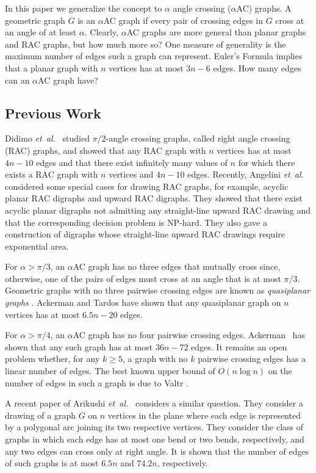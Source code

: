 \documentclass{patmorin}
\newcommand{\etal}{\emph{et~al.}}
\begin{document}
In this paper we generalize the concept to $\alpha$ angle crossing ($\alpha$AC) graphs.  A geometric graph $G$ is an $\alpha$AC graph if every pair of crossing edges in $G$ cross at an angle of at least $\alpha$.  Clearly, $\alpha$AC graphs are more general than planar graphs and RAC graphs, but how much more so?  One measure of generality is the maximum number of edges such a graph can represent.  Euler's Formula implies that a planar graph with $n$ vertices has at most $3n-6$ edges.  How many edges can an $\alpha$AC graph have?


\subsection{Previous Work}
Didimo \etal\ \cite{del-dgrac-09} studied $\pi/2$-angle crossing graphs, called right angle
crossing (RAC) graphs, and showed that any RAC graph with $n$ vertices has at most $4n-10$ edges and
that there exist infinitely many values of $n$ for
which there exists a RAC graph with $n$ vertices and $4n-10$ edges.
Recently, Angelini \etal~\cite{acddfks-porac-09} considered some
special cases for drawing RAC graphs, for example, acyclic planar RAC
digraphs and upward RAC digraphs. They showed that there exist acyclic planar
digraphs not admitting any straight-line upward RAC drawing and that the
corresponding decision problem is NP-hard. They also gave a construction of
digraphs whose straight-line upward RAC drawings require exponential area.

For $\alpha > \pi/3$, an $\alpha$AC graph has no three edges that
mutually cross since, otherwise, one of the pairs of edges must
cross at an angle that is at most $\pi/3$.  Geometric graphs with no
three pairwise crossing edges are known as \emph{quasiplanar graphs}
\cite{aapps-qpgln-97}. Ackerman and Tardos \cite[Theorem~5]{at-mneqp-07} have shown that
any quasiplanar graph on $n$ vertices has at most $6.5n - 20$ edges.

For $\alpha > \pi/4$, an $\alpha$AC graph has no four pairwise crossing edges.
Ackerman~\cite{a-mnetg-09} has shown that any such graph has at most $36n - 72$ 
edges.  It remains an open problem whether, for any $k\ge 5$, a graph with no
$k$ pairwise crossing edges has a linear number of edges.  The best known
upper bound of $O(n\log n)$ on the number of edges in such a graph is due
to Valtr \cite[Theorem~3]{v-epct-99}.

A recent paper of Arikushi \etal\ \cite{afkmt-dgoc-10} considers a similar question. They 
consider a drawing of a graph $G$ on $n$ vertices in the plane where each edge is represented 
by a polygonal arc joining its two respective vertices.  They consider the class of graphs in 
which each edge has at most one bend or two bends, respectively, and any two edges can cross 
only at right angle. It is shown that the number of edges of such graphs is at most $6.5n$ and 
$74.2n$, respectively. 
\end{document}
